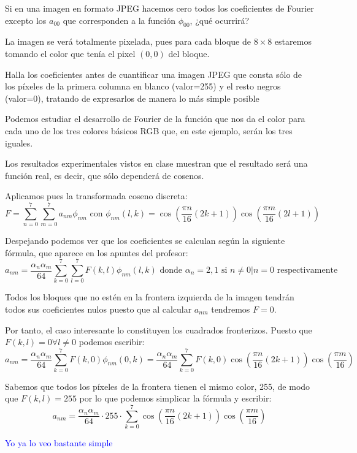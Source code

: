 \begin{problem}[6]
Si en una imagen en formato JPEG hacemos cero todos los coeficientes de Fourier excepto los $a_{00}$ que corresponden a la función $\phi_{00}$, ¿qué ocurrirá?
\solution


La imagen se verá totalmente pixelada, pues para cada bloque de $8\times 8$ estaremos tomando el color que tenía el pixel $(0,0)$ del bloque.

\end{problem}

\begin{problem}[7]
Halla los coeficientes antes de cuantificar una imagen JPEG que consta sólo de los píxeles de la primera columna en blanco (valor=255) y el resto negros (valor=0), tratando de expresarlos de manera lo más simple posible
\solution


Podemos estudiar el desarrollo de Fourier de la función que nos da el color para cada uno de los tres colores básicos RGB que, en este ejemplo, serán los tres iguales.

Los resultados experimentales vistos en clase muestran que el resultado será una función real, es decir, que sólo dependerá de cosenos.

Aplicamos pues la transformada coseno discreta:
\[F=\sum_{n=0}^7\sum_{m=0}^7 a_{nm}\phi_{nm} \text{ con } \phi_{nm}(l,k)=\cos\left(\frac{πn}{16}(2k+1) \right) \cos\left( \frac{πm}{16}(2l+1)\right)\]

Despejando podemos ver que los coeficientes se calculan según la siguiente fórmula, que aparece en los apuntes del profesor:
\[a_{nm}=\frac{α_nα_m}{64}\sum_{k=0}^7\sum_{l=0}^7F(k,l) \phi_{nm}(l,k) \text{ donde } α_n=2,1 \text{ si } n\neq0 | n = 0 \text{ respectivamente}\]

Todos los bloques que no estén en la frontera izquierda de la imagen tendrán todos sus coeficientes nulos puesto que al calcular $a_{nm}$ tendremos $F=0$.

Por tanto, el caso interesante lo constituyen los cuadrados fronterizos. Puesto que $F(k,l)=0 \forall l\neq 0$ podemos escribir:
\[a_{nm} = \frac{α_nα_m}{64}\sum_{k=0}^7F(k,0)\phi_{nm}(0,k)=\frac{α_nα_m}{64}\sum_{k=0}^7F(k,0)\cos\left(\frac{πn}{16}(2k+1) \right) \cos\left( \frac{πm}{16}\right)\]

Sabemos que todos los píxeles de la frontera tienen el mismo color, 255, de modo que $F(k,l)=255$ por lo que podemos simplicar la fórmula y escribir:
\[a_{nm}=\frac{α_nα_m}{64}\cdot 255 \cdot \sum_{k=0}^7\cos\left(\frac{πn}{16}(2k+1) \right) \cos\left( \frac{πm}{16}\right)\]

\textcolor{blue}{Yo ya lo veo bastante simple}

\end{problem}

